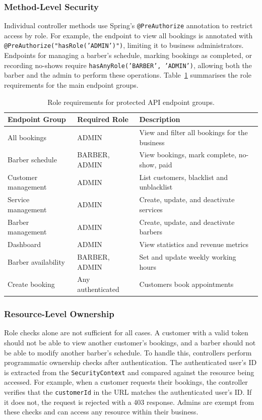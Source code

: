 \subsubsection*{Method-Level Security}
Individual controller methods use Spring's \texttt{@PreAuthorize} annotation to restrict access by role. For example, the endpoint to view all bookings is annotated with \texttt{@PreAuthorize("hasRole('ADMIN')")}, limiting it to business administrators. Endpoints for managing a barber's schedule, marking bookings as completed, or recording no-shows require \texttt{hasAnyRole('BARBER',\allowbreak{} 'ADMIN')}, allowing both the barber and the admin to perform these operations. Table~\ref{tab:rbac} summarises the role requirements for the main endpoint groups.

\begin{table}[H]
    \centering
    \begin{tabularx}{\textwidth}{|l|l|X|}
    \hline
    \textbf{Endpoint Group} & \textbf{Required Role} & \textbf{Description} \\
    \hline
    All bookings & ADMIN & View and filter all bookings for the business \\
    \hline
    Barber schedule & BARBER, ADMIN & View bookings, mark complete, no-show, paid \\
    \hline
    Customer management & ADMIN & List customers, blacklist and unblacklist \\
    \hline
    Service management & ADMIN & Create, update, and deactivate services \\
    \hline
    Barber management & ADMIN & Create, update, and deactivate barbers \\
    \hline
    Dashboard & ADMIN & View statistics and revenue metrics \\
    \hline
    Barber availability & BARBER, ADMIN & Set and update weekly working hours \\
    \hline
    Create booking & Any authenticated & Customers book appointments \\
    \hline
    \end{tabularx}
    \caption{Role requirements for protected API endpoint groups.}
    \label{tab:rbac}
\end{table}

\subsubsection*{Resource-Level Ownership}
Role checks alone are not sufficient for all cases. A customer with a valid token should not be able to view another customer's bookings, and a barber should not be able to modify another barber's schedule. To handle this, controllers perform programmatic ownership checks after authentication. The authenticated user's ID is extracted from the \texttt{SecurityContext} and compared against the resource being accessed. For example, when a customer requests their bookings, the controller verifies that the \texttt{customerId} in the URL matches the authenticated user's ID. If it does not, the request is rejected with a 403 response. Admins are exempt from these checks and can access any resource within their business.

